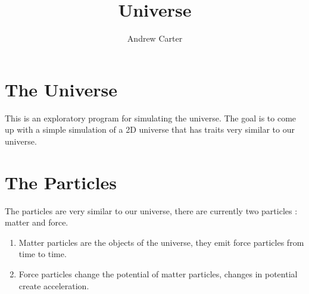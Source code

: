 \documentclass{article}
\title{Universe}
\author{Andrew Carter}
\begin{document}
\maketitle

\section{The Universe}
This is an exploratory program for simulating the universe.
The goal is to come up with a simple simulation of a 2D universe that has traits very similar to our universe.

\section{The Particles}
The particles are very similar to our universe, there are currently two particles : matter and force.
\begin{enumerate}[1.]
\item
	Matter particles are the objects of the universe, they emit force particles from time to time.
\item
	Force particles change the potential of matter particles, changes in potential create acceleration.
\end{enumerate}
\end{document}
